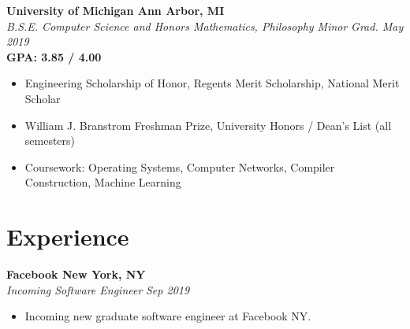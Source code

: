 \documentclass[margin,line]{resume}
\begin{document}
\begin{resume}
	\textbf{University of Michigan \hfill Ann Arbor, MI} \\\vspace{1mm}%
	\textsl{B.S.E. Computer Science and Honors Mathematics, Philosophy Minor} \hfill \textsl{Grad. May 2019}\vspace{-1mm}\\
	\textbf{GPA: 3.85 / 4.00} \\\vspace{-2.5mm}%
	\begin{itemize}[leftmargin=4mm]
		\item Engineering Scholarship of Honor, Regents Merit Scholarship, National Merit Scholar
		\item William J. Branstrom Freshman Prize, University Honors / Dean's List (all semesters)
		\item Coursework: Operating Systems, Computer Networks, Compiler Construction, Machine Learning
	\end{itemize}
	\vspace{1.5mm}

	\sectionbreak
	\section{\mysidestyle Experience}
	
	\textbf{Facebook \hfill New York, NY} \\\vspace{1mm}%
	\textsl{Incoming Software Engineer} \hfill \textsl{Sep 2019}
	\begin{itemize}[leftmargin=4mm]
		\item Incoming new graduate software engineer at Facebook NY.
	\end{itemize}
	\vspace{-1.5mm}
	

\end{resume}
\end{document}
